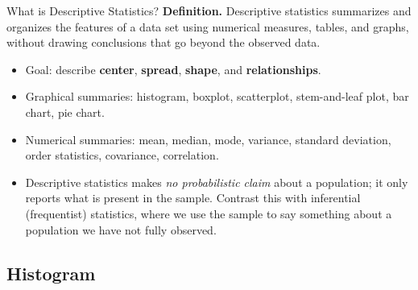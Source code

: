 \documentclass[11pt,aspectratio=169]{beamer}
\newcommand{\Def}[1]{\textbf{Definition.} #1}
\begin{document}
\begin{frame}{What is Descriptive Statistics?}
\Def{Descriptive statistics summarizes and organizes the features of a data
set using numerical measures, tables, and graphs, without drawing
conclusions that go beyond the observed data.}

\begin{itemize}
    \item Goal: describe \textbf{center}, \textbf{spread}, \textbf{shape},
          and \textbf{relationships}.
    \item Graphical summaries: histogram, boxplot, scatterplot, stem-and-leaf
          plot, bar chart, pie chart.
    \item Numerical summaries: mean, median, mode, variance, standard
          deviation, order statistics, covariance, correlation.
    \item Descriptive statistics makes \emph{no probabilistic claim} about a
          population; it only reports what is present in the sample.
          Contrast this with inferential (frequentist) statistics, where we
          use the sample to say something about a population we have not
          fully observed.
\end{itemize}
\end{frame}

\subsection{Histogram}
\end{document}
